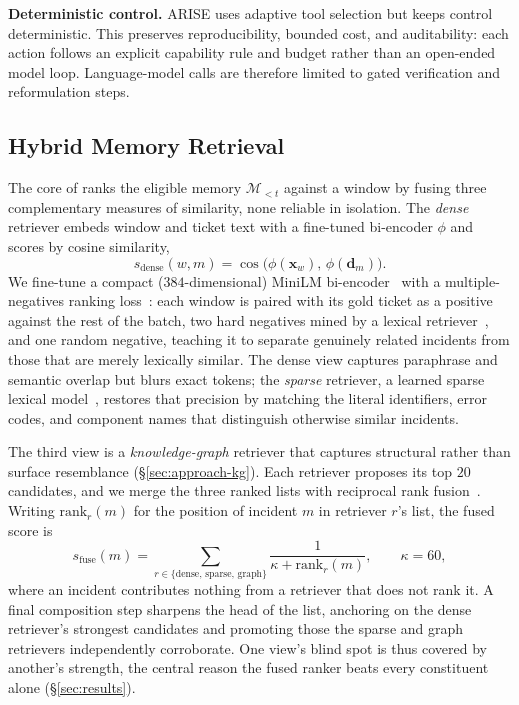 \noindent\textbf{Deterministic control.}  ARISE uses adaptive tool selection but keeps
control deterministic. This preserves reproducibility, bounded cost,
and auditability: each action follows an explicit capability rule and
budget rather than an open-ended model loop. Language-model calls
are therefore limited to gated verification and reformulation steps.

\subsection{Hybrid Memory Retrieval}
\label{sec:approach-retrieval}

The core of \sys{} ranks the eligible memory $\mathcal{M}_{<t}$ against a window
by fusing three complementary measures of similarity, none reliable in isolation.
The \emph{dense} retriever embeds window and ticket text with a fine-tuned
bi-encoder $\phi$ and scores by cosine similarity,
\begin{equation}
s_{\text{dense}}(w,m)=\cos\!\big(\phi(\mathbf{x}_w),\,\phi(\mathbf{d}_m)\big).
\end{equation}
We fine-tune a compact ($384$-dimensional) MiniLM bi-encoder~\cite{wang2020minilm,reimers2019sbert}
with a multiple-negatives ranking loss~\cite{karpukhin2020dpr}: each
window is paired with its gold ticket as a positive against the rest of the batch,
two hard negatives mined by a lexical retriever~\cite{robertson2009bm25}, and one
random negative, teaching it to separate genuinely related incidents from those
that are merely lexically similar. The dense view captures paraphrase and semantic
overlap but blurs exact tokens; the \emph{sparse} retriever, a learned sparse
lexical model~\cite{formal2021splade}, restores that precision by matching the
literal identifiers, error codes, and component names that distinguish otherwise
similar incidents.

The third view is a \emph{knowledge-graph} retriever that captures structural
rather than surface resemblance (\S\ref{sec:approach-kg}). Each retriever proposes
its top $20$ candidates, and we merge the three ranked lists with reciprocal rank
fusion~\cite{cormack2009rrf}. Writing $\mathrm{rank}_r(m)$ for the position of
incident $m$ in retriever $r$'s list, the fused score is
\begin{equation}
s_{\text{fuse}}(m)=\sum_{r\in\{\text{dense},\,\text{sparse},\,\text{graph}\}}
\frac{1}{\kappa+\mathrm{rank}_r(m)},\qquad \kappa=60,
\label{eq:rrf}
\end{equation}
where an incident contributes nothing from a retriever that does not rank it. A final composition step sharpens the head of the list, anchoring on the dense retriever's strongest candidates and promoting those the sparse and graph retrievers independently corroborate. One view's blind spot is thus covered by another's strength, the central reason the fused ranker beats every constituent
alone (\S\ref{sec:results}).

